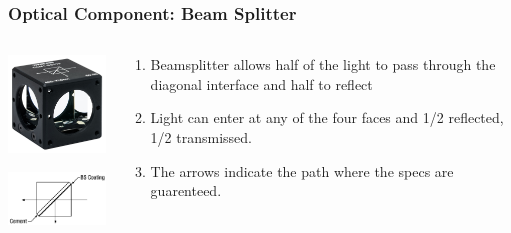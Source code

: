 \documentclass{beamer}
\begin{document}
\begin{frame}\frametitle{Optical Component: Beam Splitter}

\begin{columns}
\begin{column}{4cm}
\begin{center}
\includegraphics[width=3cm]{fig/BS013.jpg}

\vspace{0.5cm}

\includegraphics[width=4cm]{fig/beamsplitter.png}


\end{center}
\end{column}
\begin{column}{7cm}
\begin{enumerate}
\item Beamsplitter allows half of the light to pass through the diagonal interface and half to reflect
\item Light can enter at any of the four faces and 1/2 reflected, 1/2 transmissed.
\item The arrows indicate the path where the specs are guarenteed.
\end{enumerate}
\end{column}
\end{columns}

\end{frame}
\end{document}
